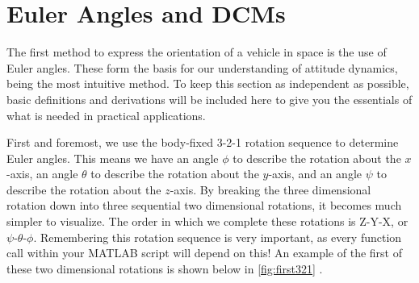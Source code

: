 \documentclass[10pt, openany, titlepage]{book}
\theoremstyle{definition}
\newcounter{example}[chapter]
\let\oldautoref\autoref
\renewcommand{\autoref}[1]{%
  \begingroup
  \hypersetup{linkcolor=black}%
  \oldautoref{#1}%
  \endgroup
}
\begin{document}
\section{Euler Angles and DCMs}\label{sec:Euler Angles}

The first method to express the orientation of a vehicle in space is the use of \gls{Euler angles}. These form the basis for our understanding of attitude dynamics, being the most intuitive method. To keep this section as independent as possible, basic definitions and derivations will be included here to give you the essentials of what is needed in practical applications.

First and foremost, we use the body-fixed 3-2-1 rotation sequence to determine \gls{Euler angles}. This means we have an angle $\phi$ to describe the rotation about the $x$-axis, an angle $\theta$ to describe the rotation about the $y$-axis, and an angle $\psi$ to describe the rotation about the $z$-axis. By breaking the three dimensional rotation down into three sequential two dimensional rotations, it becomes much simpler to visualize. The order in which we complete these rotations is Z-Y-X, or $\psi$-$\theta$-$\phi$. Remembering this rotation sequence is very important, as every function call within your MATLAB script will depend on this! An example of the first of these two dimensional rotations is shown below in \autoref{fig:first321}. 
\end{document}
